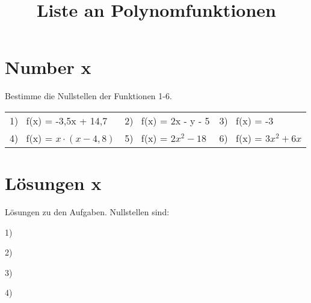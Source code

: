 \documentclass[10pt,a4paper]{article}
\begin{document}
\title{Liste an Polynomfunktionen}

\makeatletter
\def\@maketitle{%
  \newpage
  \null
  \vskip 2em%
  \begin{center}%
  \let \footnote \thanks
    {\Huge\bfseries\@title \par}%
    \vskip 1.5em%
    {\large
      \lineskip .5em%
      \begin{tabular}[t]{c}%
        \@author
      \end{tabular}\par}%
    \vskip 1em%
    {\large \@date}%
  \end{center}%
  \par
  \vskip 1.5em}
\makeatother

\author{}
\date{}

\maketitle

\section*{Number x}

Bestimme die Nullstellen der Funktionen 1-6. \newline

\begin{tabular}{l l l}

    1) \ f(x) = -3,5x + 14,7 & 2) \ f(x) = 2x - y - 5 & 3) \ f(x) = -3 \\
    4) \ f(x) = $x \cdot (x - 4,8)$ & 5) \ f(x) = $2x^2 - 18$ & 6) \ f(x) = $3x^2 + 6x$

\end{tabular}

\section*{Lösungen x}

Lösungen zu den Aufgaben. Nullstellen sind: \newline

1)

2)

3)

4)
\end{document}
